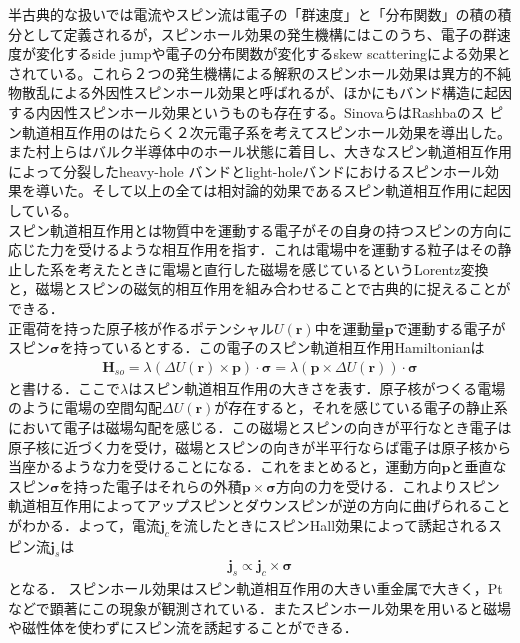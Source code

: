 半古典的な扱いでは電流やスピン流は電子の「群速度」と「分布関数」の積の積分として定義されるが，スピンホール効果の発生機構にはこのうち、電子の群速度が変化するside jumpや電子の分布関数が変化するskew scatteringによる効果とされている。これら２つの発生機構による解釈のスピンホール効果は異方的不純物散乱による外因性スピンホール効果と呼ばれるが、ほかにもバンド構造に起因する内因性スピンホール効果というものも存在する。SinovaらはRashbaのス
ピン軌道相互作用のはたらく２次元電子系を考えてスピンホール効果を導出した。また村上らはバルク半導体中のホール状態に着目し、大きなスピン軌道相互作用によって分裂したheavy-hole バンドとlight-holeバンドにおけるスピンホール効果を導いた。そして以上の全ては相対論的効果であるスピン軌道相互作用に起因している。\\
スピン軌道相互作用とは物質中を運動する電子がその自身の持つスピンの方向に応じた力を受けるような相互作用を指す．これは電場中を運動する粒子はその静止した系を考えたときに電場と直行した磁場を感じているというLorentz変換と，磁場とスピンの磁気的相互作用を組み合わせることで古典的に捉えることができる．\\
正電荷を持った原子核が作るポテンシャル$U(\bm{r})$中を運動量$\bm{p}$で運動する電子がスピン$\bm{\sigma}$を持っているとする．この電子のスピン軌道相互作用Hamiltonianは
\begin{eqnarray}
\bm{H}_{so} = \lambda(\Delta U(\bm{r})\times\bm{p})\cdot\bm{\sigma}=\lambda(\bm{p}\times\Delta U(\bm{r}))\cdot\bm{\sigma}
\label{eq:hamilso}
\end{eqnarray}
と書ける．ここで$\lambda$はスピン軌道相互作用の大きさを表す．原子核がつくる電場のように電場の空間勾配$\Delta U(\bm{r})$が存在すると，それを感じている電子の静止系において電子は磁場勾配を感じる．この磁場とスピンの向きが平行なとき電子は原子核に近づく力を受け，磁場とスピンの向きが半平行ならば電子は原子核から当座かるような力を受けることになる．これをまとめると，運動方向$\bm{p}$と垂直なスピン$\bm{\sigma}$を持った電子はそれらの外積$\bm{p}\times\bm{\sigma}$方向の力を受ける．これよりスピン軌道相互作用によってアップスピンとダウンスピンが逆の方向に曲げられることがわかる．よって，電流$\bm{j}_{c}$を流したときにスピンHall効果によって誘起されるスピン流$\bm{j}_{s}$は
\begin{eqnarray}
\bm{j}_{s}\propto\bm{j}_{c}\times\bm{\sigma}
\end{eqnarray}
となる．
スピンホール効果はスピン軌道相互作用の大きい重金属で大きく，Ptなどで顕著にこの現象が観測されている．またスピンホール効果を用いると磁場や磁性体を使わずにスピン流を誘起することができる．\\

